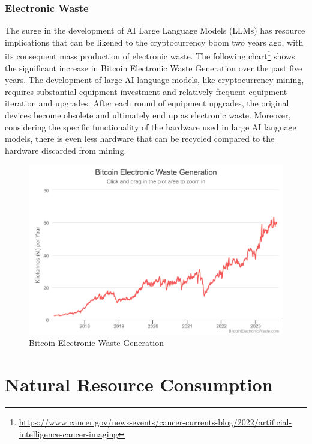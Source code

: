 \documentclass[
]{book}
\begin{document}
\hypertarget{electronic-waste}{%
\subsection{Electronic Waste}\label{electronic-waste}}

The surge in the development of AI Large Language Models (LLMs) has resource implications that can be likened to the cryptocurrency boom two years ago, with its consequent mass production of electronic waste. The following chart\footnote{\url{https://www.cancer.gov/news-events/cancer-currents-blog/2022/artificial-intelligence-cancer-imaging}} shows the significant increase in Bitcoin Electronic Waste Generation over the past five years. The development of large AI language models, like cryptocurrency mining, requires substantial equipment investment and relatively frequent equipment iteration and upgrades. After each round of equipment upgrades, the original devices become obsolete and ultimately end up as electronic waste. Moreover, considering the specific functionality of the hardware used in large AI language models, there is even less hardware that can be recycled compared to the hardware discarded from mining.

\begin{figure}
\centering
\includegraphics{figures/figure3.png}
\caption{Bitcoin Electronic Waste Generation}
\end{figure}

\hypertarget{natural-resource-consumption}{%
\chapter{Natural Resource Consumption}\label{natural-resource-consumption}}
\end{document}
